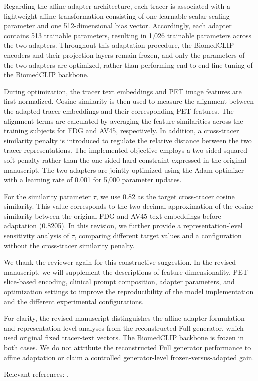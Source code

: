 {Regarding the affine-adapter architecture, each tracer is associated with a lightweight affine transformation consisting of one learnable scalar scaling parameter and one 512-dimensional bias vector. Accordingly, each adapter contains 513 trainable parameters, resulting in 1,026 trainable parameters across the two adapters. Throughout this adaptation procedure, the BiomedCLIP encoders and their projection layers remain frozen, and only the parameters of the two adapters are optimized, rather than performing end-to-end fine-tuning of the BiomedCLIP backbone.

During optimization, the tracer text embeddings and PET image features are first normalized. Cosine similarity is then used to measure the alignment between the adapted tracer embeddings and their corresponding PET features. The alignment terms are calculated by averaging the feature similarities across the training subjects for FDG and AV45, respectively. In addition, a cross-tracer similarity penalty is introduced to regulate the relative distance between the two tracer representations. The implemented objective employs a two-sided squared soft penalty rather than the one-sided hard constraint expressed in the original manuscript. The two adapters are jointly optimized using the Adam optimizer with a learning rate of 0.001 for 5,000 parameter updates.

For the similarity parameter \ensuremath{\tau}, we use 0.82 as the target cross-tracer cosine similarity. This value corresponds to the two-decimal approximation of the cosine similarity between the original FDG and AV45 text embeddings before adaptation (0.8205). In this revision, we further provide a representation-level sensitivity analysis of \ensuremath{\tau}, comparing different target values and a configuration without the cross-tracer similarity penalty.

We thank the reviewer again for this constructive suggestion. In the revised manuscript, we will supplement the descriptions of feature dimensionality, PET slice-based encoding, clinical prompt composition, adapter parameters, and optimization settings to improve the reproducibility of the model implementation and the different experimental configurations.

For clarity, the revised manuscript distinguishes the affine-adapter formulation and representation-level analyses from the reconstructed Full generator, which used original fixed tracer-text vectors. The BiomedCLIP backbone is frozen in both cases. We do not attribute the reconstructed Full generator performance to affine adaptation or claim a controlled generator-level frozen-versus-adapted gain.

Relevant references: \cite{zhang2025multimodal}.}

